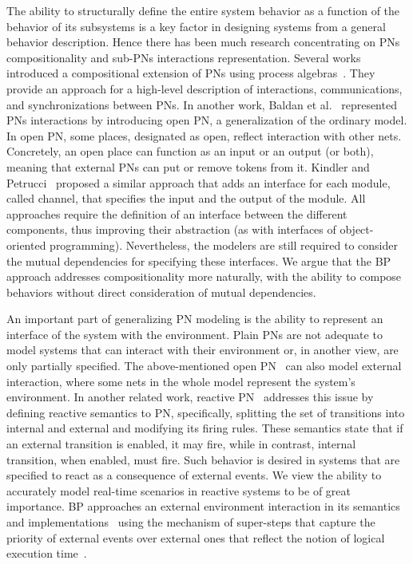 \documentclass[10pt,journal,compsoc]{IEEEtran}
\theoremstyle{definition}
\begin{document}
The ability to structurally define the entire system behavior as a function of the behavior of its subsystems is a key factor in designing systems from a general behavior description. Hence there has been much research concentrating on PNs compositionality and sub-PNs interactions representation. Several works introduced a compositional extension of PNs using process algebras~\cite{sobocinski2010representations, sobocinski2013connector, devillers2021articulations}. They provide an approach for a high-level description of interactions, communications, and synchronizations between PNs. In another work, Baldan et al.~\cite{baldan2001compositional} represented PNs interactions by introducing open PN, a generalization of the ordinary model. In open PN, some places, designated as open, reflect interaction with other nets. Concretely, an open place can function as an input or an output (or both), meaning that external PNs can put or remove tokens from it. Kindler and Petrucci~\cite{kindler2009towards} proposed a similar approach that adds an interface for each module, called channel, that specifies the input and the output of the module. All approaches require the definition of an interface between the different components, thus improving their abstraction (as with interfaces of object-oriented programming). Nevertheless, the modelers are still required to consider the mutual dependencies for specifying these interfaces. 
We argue that the BP approach addresses compositionality more naturally, with the ability to compose behaviors without direct consideration of mutual dependencies.

An important part of generalizing PN modeling is the ability to represent an interface of the system with the environment. Plain PNs are not adequate to model systems that can interact with their environment or, in another view, are only partially specified. The above-mentioned open PN~\cite{baldan2001compositional} can also model external interaction, where some nets in the whole model represent the system's environment. In another related work, reactive PN~\cite{eshuis2003reactive} addresses this issue by defining reactive semantics to PN, specifically, splitting the set of transitions into internal and external and modifying its firing rules. These semantics state that if an external transition is enabled, it may fire, while in contrast, internal transition, when enabled, must fire. Such behavior is desired in systems that are specified to react as a consequence of external events. We view the ability to accurately model real-time scenarios in reactive systems to be of great importance. BP approaches an external environment interaction in its semantics~\cite{harel2011behavioral} and implementations~\cite{bar2018bpjs} using the mechanism of super-steps that capture the priority of external events over external ones that reflect the notion of logical execution time~\cite{kirsch2012logical}.
\end{document}
